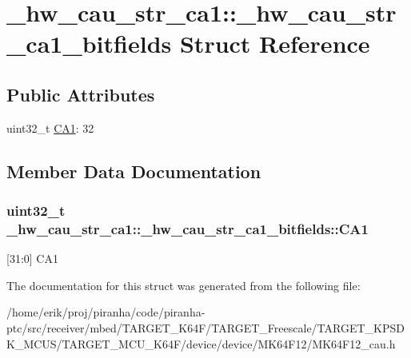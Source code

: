 \hypertarget{struct__hw__cau__str__ca1_1_1__hw__cau__str__ca1__bitfields}{}\section{\+\_\+hw\+\_\+cau\+\_\+str\+\_\+ca1\+:\+:\+\_\+hw\+\_\+cau\+\_\+str\+\_\+ca1\+\_\+bitfields Struct Reference}
\label{struct__hw__cau__str__ca1_1_1__hw__cau__str__ca1__bitfields}
\subsection*{Public Attributes}
\begin{DoxyCompactItemize}
\item 
uint32\+\_\+t \hyperlink{struct__hw__cau__str__ca1_1_1__hw__cau__str__ca1__bitfields_a074172270258d7d9a2b4cb4dffff0a65}{C\+A1}\+: 32
\end{DoxyCompactItemize}


\subsection{Member Data Documentation}
\subsubsection[{\texorpdfstring{C\+A1}{CA1}}]{\setlength{\rightskip}{0pt plus 5cm}uint32\+\_\+t \+\_\+hw\+\_\+cau\+\_\+str\+\_\+ca1\+::\+\_\+hw\+\_\+cau\+\_\+str\+\_\+ca1\+\_\+bitfields\+::\+C\+A1}\hypertarget{struct__hw__cau__str__ca1_1_1__hw__cau__str__ca1__bitfields_a074172270258d7d9a2b4cb4dffff0a65}{}\label{struct__hw__cau__str__ca1_1_1__hw__cau__str__ca1__bitfields_a074172270258d7d9a2b4cb4dffff0a65}
\mbox{[}31\+:0\mbox{]} C\+A1 

The documentation for this struct was generated from the following file\+:\begin{DoxyCompactItemize}
\item 
/home/erik/proj/piranha/code/piranha-\/ptc/src/receiver/mbed/\+T\+A\+R\+G\+E\+T\+\_\+\+K64\+F/\+T\+A\+R\+G\+E\+T\+\_\+\+Freescale/\+T\+A\+R\+G\+E\+T\+\_\+\+K\+P\+S\+D\+K\+\_\+\+M\+C\+U\+S/\+T\+A\+R\+G\+E\+T\+\_\+\+M\+C\+U\+\_\+\+K64\+F/device/device/\+M\+K64\+F12/M\+K64\+F12\+\_\+cau.\+h\end{DoxyCompactItemize}
